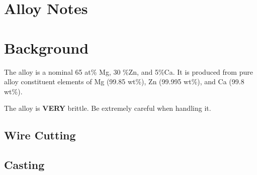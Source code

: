 \section{\MgZnCa Alloy Notes}

\section{Background}
The \MgZnCa alloy is a nominal 65 at\% Mg, 30 \%Zn, and 5\%Ca. It is produced from pure alloy constituent elements of Mg (99.85 wt\%), Zn (99.995 wt\%), and Ca (99.8 wt\%). 

The \MgZnCa alloy is \textbf{VERY} brittle. Be extremely careful when handling it. 

\subsection{Wire Cutting}


\subsection{Casting}


